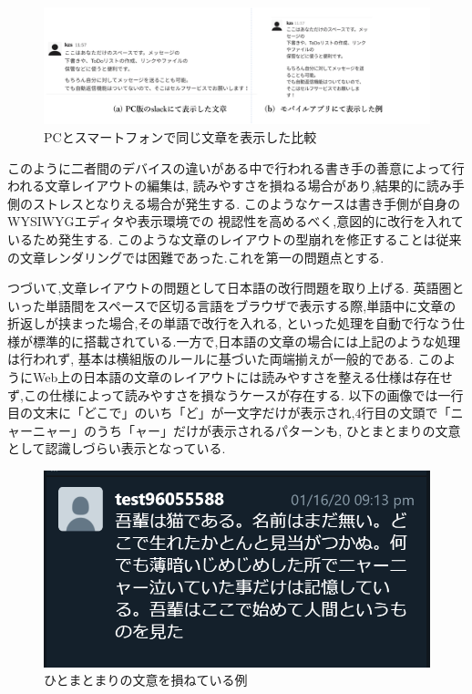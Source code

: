 
\begin{figure}[H]
    \centering
    \label{fig:image5}
    \includegraphics[width=0.9\columnwidth]{image/01/img3.png}
    \caption[PCとスマートフォンで同じ文章を表示した比較] {PCとスマートフォンで同じ文章を表示した比較}
\end{figure}

このように二者間のデバイスの違いがある中で行われる書き手の善意によって行われる文章レイアウトの編集は,
読みやすさを損ねる場合があり,結果的に読み手側のストレスとなりえる場合が発生する.
このようなケースは書き手側が自身のWYSIWYGエディタや表示環境での
視認性を高めるべく,意図的に改行を入れているため発生する.
このような文章のレイアウトの型崩れを修正することは従来の文章レンダリングでは困難であった.これを第一の問題点とする.

つづいて,文章レイアウトの問題として日本語の改行問題を取り上げる.
英語圏といった単語間をスペースで区切る言語をブラウザで表示する際,単語中に文章の折返しが挟まった場合,その単語で改行を入れる,
といった処理を自動で行なう仕様が標準的に搭載されている.一方で,日本語の文章の場合には上記のような処理は行われず,
基本は横組版のルールに基づいた両端揃えが一般的である.
このようにWeb上の日本語の文章のレイアウトには読みやすさを整える仕様は存在せず,この仕様によって読みやすさを損なうケースが存在する.
以下の画像では一行目の文末に「どこで」のいち「ど」が一文字だけが表示され,4行目の文頭で「ニャーニャー」のうち「ャー」だけが表示されるパターンも,
ひとまとまりの文意として認識しづらい表示となっている.

\begin{figure}[H]
        \centering
        \label{fig:sokoneteiru}
        \includegraphics[width=0.7\columnwidth]{image/01/img5.png}
        \caption[ひとまとまりの文意を損ねている例] {ひとまとまりの文意を損ねている例}
\end{figure}

